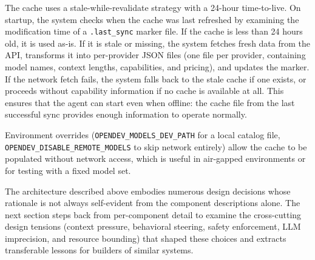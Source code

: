 The cache uses a stale-while-revalidate strategy with a 24-hour time-to-live. On startup, the system checks when the cache was last refreshed by examining the modification time of a \texttt{.last\_sync} marker file. If the cache is less than 24 hours old, it is used as-is. If it is stale or missing, the system fetches fresh data from the API, transforms it into per-provider JSON files (one file per provider, containing model names, context lengths, capabilities, and pricing), and updates the marker. If the network fetch fails, the system falls back to the stale cache if one exists, or proceeds without capability information if no cache is available at all. This ensures that the agent can start even when offline: the cache file from the last successful sync provides enough information to operate normally.

Environment overrides (\texttt{OPENDEV\_MODELS\_DEV\_PATH} for a local catalog file, \texttt{OPENDEV\_DISABLE\_REMOTE\_MODELS} to skip network entirely) allow the cache to be populated without network access, which is useful in air-gapped environments or for testing with a fixed model set.

\medskip
\noindent The architecture described above embodies numerous design decisions whose rationale is not always self-evident from the component descriptions alone. The next section steps back from per-component detail to examine the cross-cutting design tensions (context pressure, behavioral steering, safety enforcement, LLM imprecision, and resource bounding) that shaped these choices and extracts transferable lessons for builders of similar systems.
